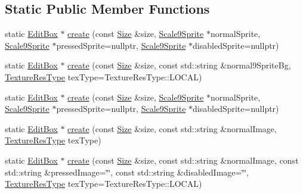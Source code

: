 \subsection*{Static Public Member Functions}
\begin{DoxyCompactItemize}
\item 
static \hyperlink{classui_1_1EditBox}{Edit\+Box} $\ast$ \hyperlink{classui_1_1EditBox_a49123784600ab9e7913688fc199ca5b1}{create} (const \hyperlink{classSize}{Size} \&size, \hyperlink{classui_1_1Scale9Sprite}{Scale9\+Sprite} $\ast$normal\+Sprite, \hyperlink{classui_1_1Scale9Sprite}{Scale9\+Sprite} $\ast$pressed\+Sprite=nullptr, \hyperlink{classui_1_1Scale9Sprite}{Scale9\+Sprite} $\ast$disabled\+Sprite=nullptr)
\item 
static \hyperlink{classui_1_1EditBox}{Edit\+Box} $\ast$ \hyperlink{classui_1_1EditBox_a7426d58fa48283337dc62f12863e085a}{create} (const \hyperlink{classSize}{Size} \&size, const std\+::string \&normal9\+Sprite\+Bg, \hyperlink{classui_1_1Widget_a040a65ec5ad3b11119b7e16b98bd9af0}{Texture\+Res\+Type} tex\+Type=Texture\+Res\+Type\+::\+L\+O\+C\+AL)
\item 
static \hyperlink{classui_1_1EditBox}{Edit\+Box} $\ast$ \hyperlink{classui_1_1EditBox_a49123784600ab9e7913688fc199ca5b1}{create} (const \hyperlink{classSize}{Size} \&size, \hyperlink{classui_1_1Scale9Sprite}{Scale9\+Sprite} $\ast$normal\+Sprite, \hyperlink{classui_1_1Scale9Sprite}{Scale9\+Sprite} $\ast$pressed\+Sprite=nullptr, \hyperlink{classui_1_1Scale9Sprite}{Scale9\+Sprite} $\ast$disabled\+Sprite=nullptr)
\item 
static \hyperlink{classui_1_1EditBox}{Edit\+Box} $\ast$ \hyperlink{classui_1_1EditBox_ab798f4ef40435304ae46ca44881f7f10}{create} (const \hyperlink{classSize}{Size} \&size, const std\+::string \&normal\+Image, \hyperlink{classui_1_1Widget_a040a65ec5ad3b11119b7e16b98bd9af0}{Texture\+Res\+Type} tex\+Type)
\item 
static \hyperlink{classui_1_1EditBox}{Edit\+Box} $\ast$ \hyperlink{classui_1_1EditBox_a50dfa83de5b1ae5834142714d7863cef}{create} (const \hyperlink{classSize}{Size} \&size, const std\+::string \&normal\+Image, const std\+::string \&pressed\+Image=\char`\"{}\char`\"{}, const std\+::string \&disabled\+Image=\char`\"{}\char`\"{}, \hyperlink{classui_1_1Widget_a040a65ec5ad3b11119b7e16b98bd9af0}{Texture\+Res\+Type} tex\+Type=Texture\+Res\+Type\+::\+L\+O\+C\+AL)
\end{DoxyCompactItemize}

